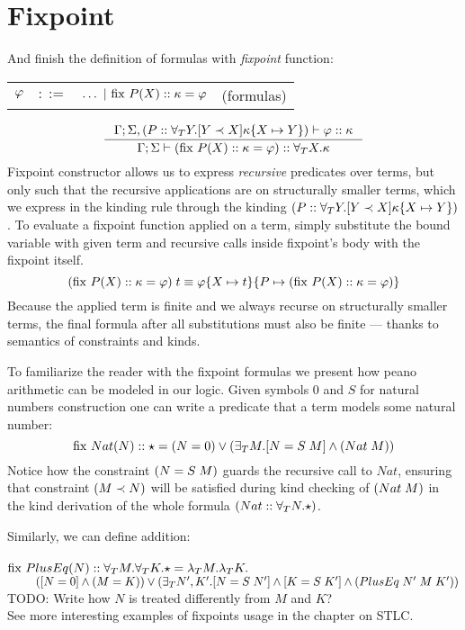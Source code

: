 \documentclass[english, mgr]{iithesis}
\begin{document}
\section{Fixpoint}
\newcommand{\fix}[3]{\ensuremath{\text{fix }#1(#2)\ofkind#3=}}
And finish the definition of formulas with \textit{fixpoint} function:

\begin{tabular}{rrlr}
$\varphi$ & $::=$ & $\ldots
               \bnfor \fix{\propv}{\termv}{\kind}{\formphi} $
    & (formulas)
\end{tabular}
$$
\inference{
  \cEnv;\kEnv, (\propv \ofkind \kForallTerm{Y} \kGuard{Y \cshlt \termv}{\kind\subst{\termv}{Y}})\vdash \formphi \ofkind \kind
}{
  \cEnv;\kEnv\vdash (\fix{\propv}{\termv}{\kind}{\formphi}) \ofkind \kForallTerm{\termv}{\kind}
}
$$
Fixpoint constructor allows us to express \textit{recursive} predicates over terms,
but only such that the recursive applications are on structurally smaller terms,
which we express in the kinding rule through the kinding $(P :: \forall_T Y . [Y \prec X]{\kappa\{X\mapsto Y\}})$.
To evaluate a fixpoint function applied on a term, simply substitute the bound
variable with given term and recursive calls inside fixpoint's body with the fixpoint itself.
$$
(\fix{\propv}{\termv}{\kind}{\formphi})\fApp\term
\equiv
\formphi\subst{\termv}{\term}\subst{\propv}{(\fix{\propv}{\termv}{\kind}{\formphi})}
$$
Because the applied term is finite and we always recurse on structurally smaller
terms, the final formula after all substitutions must also be finite ---
thanks to semantics of constraints and kinds.

To familiarize the reader with the fixpoint formulas we present
how peano arithmetic can be modeled in our logic.
Given symbols $0$ and $S$ for natural numbers construction one can write a
predicate that a term models some natural number:
$$
\fix{Nat}{N}{\kProp}{(N \ceq 0) \vee (\fExistsTerm{M} \fCAnd{N \ceq {S \tapp M}} ({Nat}\fAppTerm{M}))}
$$
Notice how the constraint $(N = {S \; M})$ guards the recursive call to $Nat$,
ensuring that constraint $(M \prec N)$ will be satisfied during kind checking of
$({{Nat}\;M})$ in the kind derivation of the whole formula
$({Nat} :: \forall_T N .{\star})$.

Similarly, we can define addition: \\ \\
$\fix{PlusEq}{N}{\kForallTerm{M}\kForallTerm{K}\kProp}{\fLamTerm{M}\fLamTerm{K}}$ \\
$\text{ }\qquad
  ([N = 0]\wedge{(M =K)}) \vee
   (\exists_T N', K' .[N = {S \; N'}]\wedge[K = {S \; K'}]\wedge{({PlusEq}\;{N'}\;{M}\;{K'})}
   )
$
\\
TODO: Write how $N$ is treated differently from $M$ and $K$?
\\
See more interesting examples of fixpoints usage in the chapter on STLC.
\end{document}
